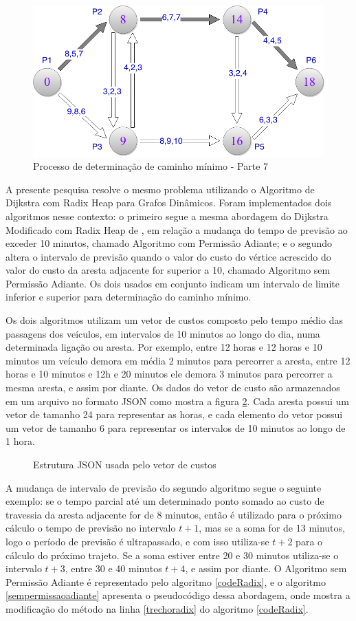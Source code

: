 \begin{figure}[htbp]
\centering
 \includegraphics[width=.50\textwidth]{figuras/leo8.png}
\caption{Processo de determinação de caminho mínimo - Parte 7}
\label{fig:leo8}
\end{figure}
\FloatBarrier

A presente pesquisa resolve o mesmo problema utilizando o Algoritmo de Dijkstra com Radix Heap para Grafos Dinâmicos.
Foram implementados dois algoritmos nesse contexto: o primeiro segue a mesma abordagem do Dijkstra Modificado com Radix Heap
de \cite{leonard}, em relação a mudança do tempo de previsão ao exceder 10 minutos, chamado Algoritmo com Permissão Adiante;
e o segundo altera o intervalo de previsão quando o valor do custo do vértice acrescido do valor do custo da aresta adjacente 
for superior a 10, chamado Algoritmo sem Permissão Adiante.
Os dois usados em conjunto indicam um intervalo de limite inferior e superior para determinação do caminho mínimo.

Os dois algoritmos utilizam um vetor de custos composto pelo tempo médio das passagens dos veículos, em intervalos
de 10 minutos ao longo do dia, numa determinada ligação ou aresta. Por exemplo, entre 12 horas e 12 horas e 10 minutos um
veículo demora em média 2 minutos para percorrer a aresta, entre 12 horas e 10 minutos e 12h e 20 minutos ele demora 3 minutos
para percorrer a mesma aresta, e assim por diante. Os dados do vetor de custo são armazenados em um arquivo no formato JSON
como mostra a figura \ref{fig:tabelajson}. Cada aresta possui um vetor de tamanho 24 para representar as horas, e cada elemento
do vetor possui um vetor de tamanho 6 para representar os intervalos de 10 minutos ao longo de 1 hora.


\begin{figure}[htbp]
  \caption{Estrutura JSON usada pelo vetor de custos}
  \label{fig:tabelajson}
\end{figure}
\FloatBarrier

A mudança de intervalo de previsão do segundo algoritmo segue o seguinte exemplo: se o tempo parcial até um determinado 
ponto somado ao custo de travessia da aresta adjacente for de 8 minutos, então é utilizado para o próximo cálculo o tempo
de previsão no intervalo $t + 1$, mas se a soma for de 13 minutos, logo o período de previsão é ultrapassado, e com isso
utiliza-se $t + 2$ para o cálculo do próximo trajeto. Se a soma estiver entre 20 e 30 minutos utiliza-se o intervalo
$t + 3$, entre 30 e 40 minutos $t + 4$, e assim por diante.
O Algoritmo sem Permissão Adiante é representado pelo algoritmo \ref{codeRadix}, e o algoritmo \ref{sempermissaoadiante}
apresenta o pseudocódigo dessa abordagem, onde mostra a modificação do método na linha \ref{trechoradix} do
algoritmo \ref{codeRadix}.

